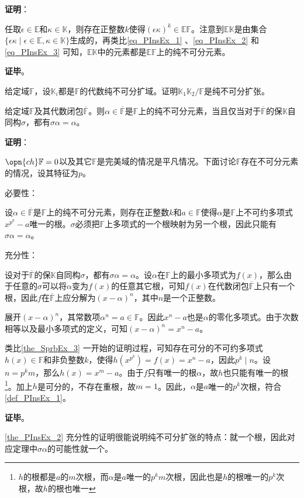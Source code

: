 \textbf{证明}：

任取$\epsilon\in\mathbb{E}$和$\kappa\in\mathbb{K}$，则存在正整数$k$使得$(\epsilon\kappa)^k\in\mathbb{EF}$。注意到$\mathbb{EK}$是由集合$\{\epsilon\kappa\mid\epsilon\in\mathbb{E}, \kappa\in\mathbb{K}\}$生成的，再类比\autoref{eq_PInsEx_1} 、\autoref{eq_PInsEx_2} 和\autoref{eq_PInsEx_3} 可知，$\mathbb{EK}$中的元素都是$\mathbb{EF}$上的纯不可分元素。

\textbf{证毕}。


\begin{exercise}{}
给定域$\mathbb{F}$，设$\mathbb{K}_i$都是$\mathbb{F}$的代数纯不可分扩域。证明$\mathbb{K}_1\mathbb{K}_2/\mathbb{F}$是纯不可分扩张。
\end{exercise}

\begin{theorem}{}\label{the_PInsEx_2}
给定域$\mathbb{F}$及其代数闭包$\overline{\mathbb{F}}$。则$\alpha\in\overline{\mathbb{F}}$是$\mathbb{F}$上的纯不可分元素，当且仅当对于$\overline{\mathbb{F}}$的保$\mathbb{K}$自同构$\sigma$，都有$\sigma\alpha=\alpha$。
\end{theorem}

\textbf{证明}：

$\opn{ch}\mathbb{F}=0$以及其它$\mathbb{F}$是完美域的情况是平凡情况。下面讨论$\mathbb{F}$存在不可分元素的情况，设其特征为$p$。

必要性：

设$\alpha\in\overline{\mathbb{F}}$是$\mathbb{F}$上的纯不可分元素，则存在正整数$k$和$a\in\mathbb{F}$使得$\alpha$是$\mathbb{F}$上不可约多项式$x^{p^k}-a$唯一的根。$\sigma$必须把$\mathbb{F}$上多项式的一个根映射为另一个根，因此只能有$\sigma\alpha=\alpha$。







充分性：

设对于$\overline{\mathbb{F}}$的保$\mathbb{K}$自同构$\sigma$，都有$\sigma\alpha=\alpha$。设$\alpha$在$\mathbb{F}$上的最小多项式为$f(x)$，那么由于任意的$\sigma$可以将$\alpha$变为$f(x)$的任意其它根，可知$f(x)$在代数闭包$\overline{\mathbb{F}}$上只有一个根，因此$f$在$\overline{\mathbb{F}}$上应分解为$(x-\alpha)^n$，其中$n$是一个正整数。

展开$(x-\alpha)^n$，其常数项$\alpha^n=a\in\mathbb{F}$。因此$x^n-a$也是$\alpha$的零化多项式。由于次数相等以及最小多项式的定义，可知$(x-\alpha)^n=x^n-a$。

类比\autoref{the_SprbEx_3} 一开始的证明过程，可知存在可分的不可约多项式$h(x)\in\mathbb{F}$和非负整数$k$，使得$h(x^{p^k})=f(x)=x^n-a$，因此$p^k\mid n$。设$n=p^km$，那么$h(x)=x^m-a$。由于$f$只有唯一的根$\alpha$，故$h$也只能有唯一的根\footnote{$h$的根都是$a$的$m$次根，而$\alpha$是$a$唯一的$p^km$次根，因此也是$h$的根唯一的$p^k$次根，故$h$的根也唯一}。加上$h$是可分的，不存在重根，故$m=1$。因此，$\alpha$是$a$唯一的$p^k$次根，符合\autoref{def_PInsEx_1}。

\textbf{证毕}。

\autoref{the_PInsEx_2} 充分性的证明很能说明纯不可分扩张的特点：就一个根，因此对应定理中$\sigma \alpha$的可能性就一个。








